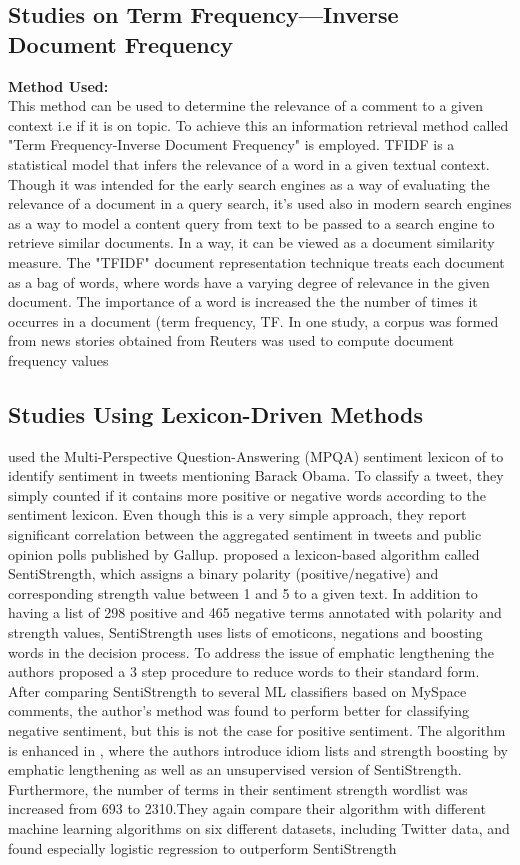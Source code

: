 \subsection{Studies on Term Frequency—Inverse Document Frequency}
\textbf{Method Used:}\\
This method can be used to determine the relevance of a comment to  a given context i.e if it is on topic. To achieve this an information retrieval method called "Term Frequency-Inverse Document Frequency" is employed.
TFIDF is a statistical model that infers the relevance of a word in a given textual context.
Though it was intended for the early search engines as a way of evaluating the relevance of a document in a query search, it's used also in modern search engines as a way to model a content query from text to be passed to a search engine to retrieve similar documents. In a way, it can be viewed as a document similarity measure. The "TFIDF" document representation technique treats each document as
a bag of words, where words have a varying degree of relevance  in the given document. The importance of a word is increased the the number of times it occurres in a document (term frequency, TF. In one study,  a corpus was formed from news stories obtained from Reuters was used to compute document frequency values


\subsection{Studies Using Lexicon-Driven Methods}
\cite{ref33} used the Multi-Perspective Question-Answering (MPQA) sentiment lexicon of \cite{ref34} to identify sentiment in tweets mentioning Barack Obama. To classify a tweet, they simply counted if it contains more positive or negative words according to the sentiment lexicon. Even though this is a very simple approach, they report significant correlation between the aggregated sentiment in tweets and public opinion polls published by Gallup. \cite{ref35} proposed a lexicon-based algorithm called SentiStrength, which assigns a binary polarity (positive/negative) and corresponding strength value between 1 and 5 to a given text. In addition to having a list of 298 positive and 465 negative terms annotated with polarity and strength values, SentiStrength uses lists of emoticons, negations and boosting words in the decision process. To address the issue of emphatic lengthening the authors proposed a 3 step procedure to reduce words to their standard form. After comparing SentiStrength to several ML classifiers based on MySpace comments, the author's method was found to perform better for classifying negative sentiment, but this is not the case for positive sentiment. The algorithm is enhanced in \cite{ref35}, where the authors introduce idiom lists and strength boosting by emphatic lengthening as well as an unsupervised version of SentiStrength. Furthermore, the number of terms in their sentiment strength wordlist was increased from 693 to 2310.They again compare their algorithm with different machine learning algorithms on six different datasets, including Twitter data, and found especially logistic regression to outperform SentiStrength \cite{ref35}

